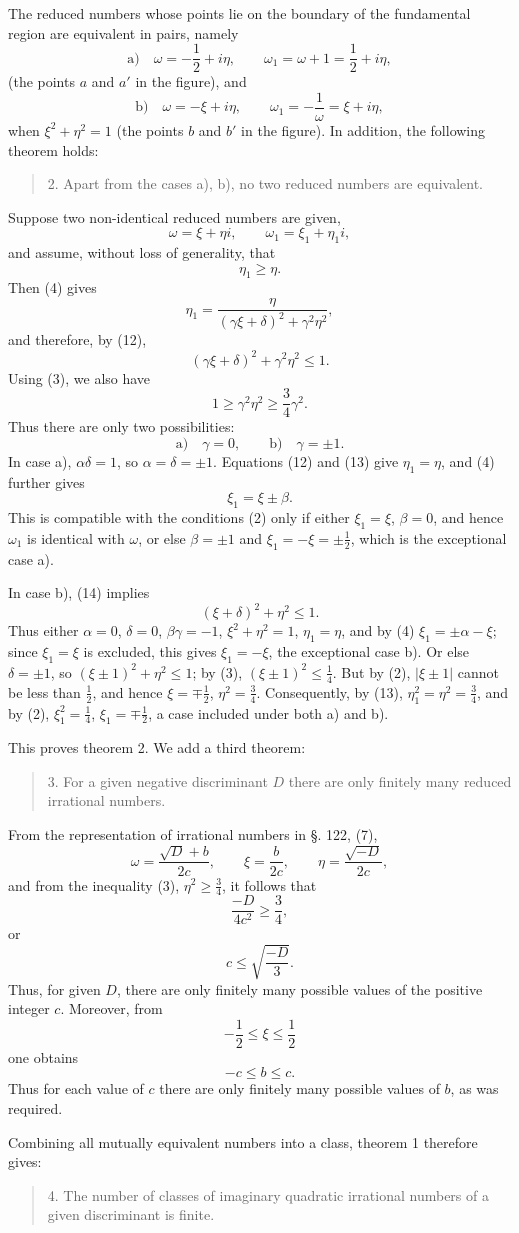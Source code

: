 \documentclass[11pt]{article}
\begin{document}
The reduced numbers whose points lie on the boundary of the fundamental region are equivalent in pairs, namely
\[
\text{a)}\quad \omega=-\frac12+i\eta,
\qquad
\omega_1=\omega+1=\frac12+i\eta,
\]
(the points $a$ and $a'$ in the figure), and
\[
\text{b)}\quad \omega=-\xi+i\eta,
\qquad
\omega_1=-\frac1\omega=\xi+i\eta,
\]
when $\xi^2+\eta^2=1$ (the points $b$ and $b'$ in the figure). In addition, the following theorem holds:

\begin{quote}
2. Apart from the cases a), b), no two reduced numbers are equivalent.
\end{quote}

Suppose two non-identical reduced numbers are given,
\[
\tag{11}       \omega=\xi+\eta i,
        \qquad
        \omega_1=\xi_1+\eta_1 i,
\]
and assume, without loss of generality, that
\[
\tag{12}       \eta_1\ge\eta.
\]
Then (4) gives
\[
\tag{13}       \eta_1=
\frac{\eta}{(\gamma\xi+\delta)^2+\gamma^2\eta^2},
\]
and therefore, by (12),
\[
\tag{14}       (\gamma\xi+\delta)^2+\gamma^2\eta^2\le1.
\]
Using (3), we also have
\[
\tag{15}       1\ge \gamma^2\eta^2\ge \frac34\gamma^2.
\]
Thus there are only two possibilities:
\[
        \text{a)}\quad \gamma=0,
        \qquad
        \text{b)}\quad \gamma=\pm1.
\]
In case a), $\alpha\delta=1$, so $\alpha=\delta=\pm1$. Equations (12) and (13) give $\eta_1=\eta$, and (4) further gives
\[
        \xi_1=\xi\pm\beta.
\]
This is compatible with the conditions (2) only if either $\xi_1=\xi$, $\beta=0$, and hence $\omega_1$ is identical with $\omega$, or else $\beta=\pm1$ and $\xi_1=-\xi=\pm\frac12$, which is the exceptional case a).

In case b), (14) implies
\[
        (\xi+\delta)^2+\eta^2\le1.
\]
Thus either $\alpha=0$, $\delta=0$, $\beta\gamma=-1$, $\xi^2+\eta^2=1$, $\eta_1=\eta$, and by (4) $\xi_1=\pm\alpha-\xi$; since $\xi_1=\xi$ is excluded, this gives $\xi_1=-\xi$, the exceptional case b). Or else $\delta=\pm1$, so $(\xi\pm1)^2+\eta^2\le1$; by (3), $(\xi\pm1)^2\le\frac14$. But by (2), $|\xi\pm1|$ cannot be less than $\frac12$, and hence $\xi=\mp\frac12$, $\eta^2=\frac34$. Consequently, by (13), $\eta_1^2=\eta^2=\frac34$, and by (2), $\xi_1^2=\frac14$, $\xi_1=\mp\frac12$, a case included under both a) and b).

This proves theorem 2. We add a third theorem:
\begin{quote}
3. For a given negative discriminant $D$ there are only finitely many reduced irrational numbers.
\end{quote}
From the representation of irrational numbers in §. 122, (7),
\[
        \omega=\frac{\sqrt D+b}{2c},
        \qquad
        \xi=\frac b{2c},
        \qquad
        \eta=\frac{\sqrt{-D}}{2c},
\]
and from the inequality (3), $\eta^2\ge\frac34$, it follows that
\[
        \frac{-D}{4c^2}\ge\frac34,
\]
or
\[
        c\le \sqrt{\frac{-D}{3}}.
\]
Thus, for given $D$, there are only finitely many possible values of the positive integer $c$. Moreover, from
\[
        -\frac12\le\xi\le\frac12
\]
one obtains
\[
        -c\le b\le c.
\]
Thus for each value of $c$ there are only finitely many possible values of $b$, as was required.

Combining all mutually equivalent numbers into a class, theorem 1 therefore gives:
\begin{quote}
4. The number of classes of imaginary quadratic irrational numbers of a given discriminant is finite.
\end{quote}
\end{document}
